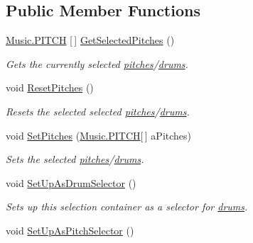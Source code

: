 \subsection*{Public Member Functions}
\begin{DoxyCompactItemize}
\item 
\hyperlink{group___music_enums_ga508f69b199ea518f935486c990edac1d}{Music.\+P\+I\+T\+CH} \mbox{[}$\,$\mbox{]} \hyperlink{group___s_c___p_s_c_pub_func_ga05750cc6e1199f1522f8b87d6579dc34}{Get\+Selected\+Pitches} ()
\begin{DoxyCompactList}\small\item\em Gets the currently selected \hyperlink{group___music_enums_ga508f69b199ea518f935486c990edac1d}{pitches}/\hyperlink{group___music_enums_gade475b4382c7066d1af13e7c13c029b6}{drums}. \end{DoxyCompactList}\item 
void \hyperlink{group___s_c___p_s_c_pub_func_ga678ef561c5418e4bf43a5f9ed753f0f0}{Reset\+Pitches} ()
\begin{DoxyCompactList}\small\item\em Resets the selected selected \hyperlink{group___music_enums_ga508f69b199ea518f935486c990edac1d}{pitches}/\hyperlink{group___music_enums_gade475b4382c7066d1af13e7c13c029b6}{drums}. \end{DoxyCompactList}\item 
void \hyperlink{group___s_c___p_s_c_pub_func_ga0b85aab924084ebb49be4f64ad6f81e5}{Set\+Pitches} (\hyperlink{group___music_enums_ga508f69b199ea518f935486c990edac1d}{Music.\+P\+I\+T\+CH}\mbox{[}$\,$\mbox{]} a\+Pitches)
\begin{DoxyCompactList}\small\item\em Sets the selected \hyperlink{group___music_enums_ga508f69b199ea518f935486c990edac1d}{pitches}/\hyperlink{group___music_enums_gade475b4382c7066d1af13e7c13c029b6}{drums}. \end{DoxyCompactList}\item 
void \hyperlink{group___s_c___p_s_c_pub_func_ga08a0a4943359eb7f28c64aaf4cbc233c}{Set\+Up\+As\+Drum\+Selector} ()
\begin{DoxyCompactList}\small\item\em Sets up this selection container as a selector for \hyperlink{group___music_enums_gade475b4382c7066d1af13e7c13c029b6}{drums}. \end{DoxyCompactList}\item 
void \hyperlink{group___s_c___p_s_c_pub_func_gaf6e9338cfe7202df9787304e49afa24d}{Set\+Up\+As\+Pitch\+Selector} ()

\end{DoxyCompactItemize}
